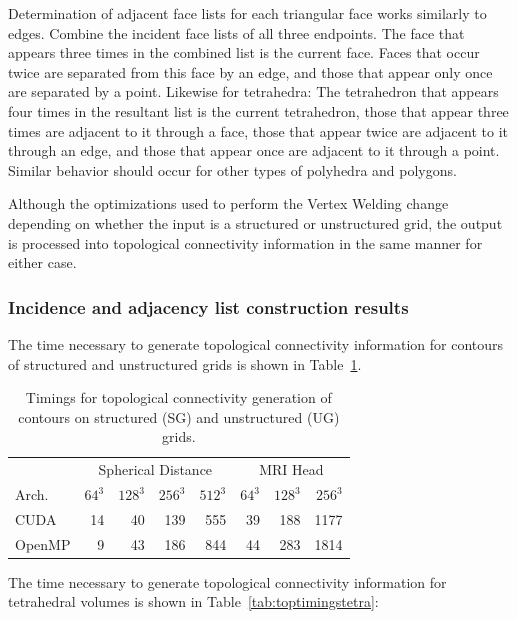 \documentclass[journal]{vgtc}                %
\begin{document}
Determination of adjacent face lists for each triangular face works similarly to edges. Combine the incident face lists of all three endpoints. The face that appears three times in the combined list is the current face. Faces that occur twice are separated from this face by an edge, and those that appear only once are separated by a point.
Likewise for tetrahedra: The tetrahedron that appears four times in the resultant list is the current tetrahedron, those that appear three times are adjacent to it through a face, those that appear twice are adjacent to it through an edge, and those that appear once are adjacent to it through a point. Similar behavior should occur for other types of polyhedra and polygons.

Although the optimizations used to perform the Vertex Welding change depending on whether the input is a structured or unstructured grid, the output is processed into topological connectivity information in the same manner for either case.


\subsubsection{Incidence and adjacency list construction results}
The time necessary to generate topological connectivity information for contours of structured and unstructured grids is shown in Table~\ref{tab:toptimings}.


\begin{table}[h!]
\begin{center}
\begin{tabular}{l|r r r r|r r r}
 & \multicolumn{4}{|c|}{Spherical Distance} & \multicolumn{3}{|c}{MRI Head}\\
Arch. & $64^3$ & $128^3$ & $256^3$ & $512^3$ & $64^3$ & $128^3$ & $256^3$\\
\hline
CUDA & 14 & 40 & 139 & 555 & 39 & 188 & 1177 \\
OpenMP & 9 & 43 & 186 & 844 & 44 & 283 & 1814 \\
\end{tabular}
\end{center}
\caption{Timings for topological connectivity generation of contours on structured (SG) and unstructured (UG) grids.}
\label{tab:toptimings}
\end{table}

The time necessary to generate topological connectivity information for tetrahedral volumes is shown in Table~\ref{tab:toptimingstetra}:
\end{document}
